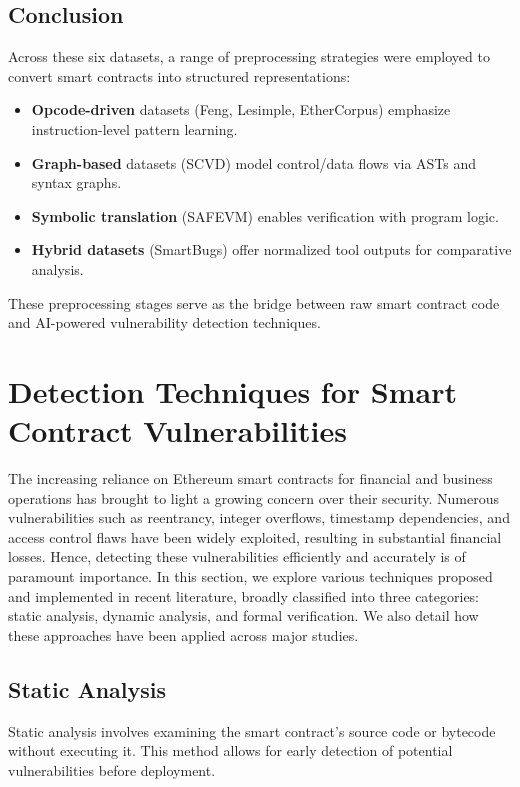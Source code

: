 \subsection*{Conclusion}

Across these six datasets, a range of preprocessing strategies were employed to convert smart contracts into structured representations:

\begin{itemize}
    \item \textbf{Opcode-driven} datasets (Feng, Lesimple, EtherCorpus) emphasize instruction-level pattern learning.
    \item \textbf{Graph-based} datasets (SCVD) model control/data flows via ASTs and syntax graphs.
    \item \textbf{Symbolic translation} (SAFEVM) enables verification with program logic.
    \item \textbf{Hybrid datasets} (SmartBugs) offer normalized tool outputs for comparative analysis.
\end{itemize}

These preprocessing stages serve as the bridge between raw smart contract code and AI-powered vulnerability detection techniques.

\section{Detection Techniques for Smart Contract Vulnerabilities}
The increasing reliance on Ethereum smart contracts for financial and business operations has brought to light a growing concern over their security. Numerous vulnerabilities such as reentrancy, integer overflows, timestamp dependencies, and access control flaws have been widely exploited, resulting in substantial financial losses. Hence, detecting these vulnerabilities efficiently and accurately is of paramount importance. In this section, we explore various techniques proposed and implemented in recent literature, broadly classified into three categories: static analysis, dynamic analysis, and formal verification. We also detail how these approaches have been applied across major studies.
\subsection*{Static Analysis}

Static analysis involves examining the smart contract’s source code or bytecode without executing it. This method allows for early detection of potential vulnerabilities before deployment.

